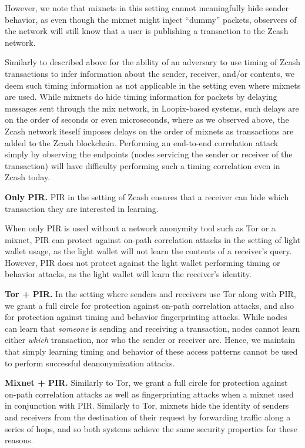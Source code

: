 \documentclass{article}
\begin{document}
However, we note that mixnets in this setting cannot meaningfully hide sender
behavior, as even though the mixnet might inject
``dummy'' packets, observers of the network will still know that a user is
publishing a transaction to the Zcash network.

Similarly to described above for the ability of an adversary to use timing of
Zcash transactions to infer information about the sender, receiver, and/or
contents, we deem such timing information as not applicable in the setting even
where mixnets are used. While mixnets do hide timing information for packets by
delaying messages sent through the mix network, in Loopix-based systems, such
delays are on the order of seconds or even microseconds, where as we observed
above, the Zcash network iteself imposes delays on the order of mixnets as
transactions are added to the Zcash blockchain. Performing an end-to-end
correlation attack simply by observing the endpoints (nodes servicing the
sender or receiver of the transaction) will have difficulty performing such a
timing correlation even in Zcash today.

\textbf{Only PIR.}
PIR in the setting of Zcash ensures that a receiver can hide which transaction
they are interested in learning.

When only PIR is used without a network anonymity tool such as Tor or a mixnet,
PIR can protect against on-path correlation attacks in the setting of light
wallet usage, as the light wallet will not learn the contents of a receiver's
query. However, PIR does not protect against the light wallet performing timing
or behavior attacks, as the light wallet will learn the receiver's identity.

\textbf{Tor + PIR.}
In the setting where senders and receivers use Tor along with PIR, we grant a
full circle for protection against on-path correlation
attacks, and also for protection against timing and behavior fingerprinting
attacks. While nodes can learn that \emph{someone} is sending and receiving a
transaction, nodes cannot learn either \emph{which} transaction, nor who the
sender or receiver are. Hence, we maintain that simply learning timing and
behavior of these access patterns cannot be used to perform successful
deanonymization attacks.

\textbf{Mixnet + PIR.}
Similarly to Tor, we grant a full circle for protection against on-path
correlation attacks as well as fingerprinting attacks when a mixnet used in
conjunction with PIR. Similarly to Tor, mixnets hide the identity of senders
and receivers from the destination of their request by forwarding traffic along
a series of hops, and so both systems achieve the same security properties for
these reasons.
\end{document}
